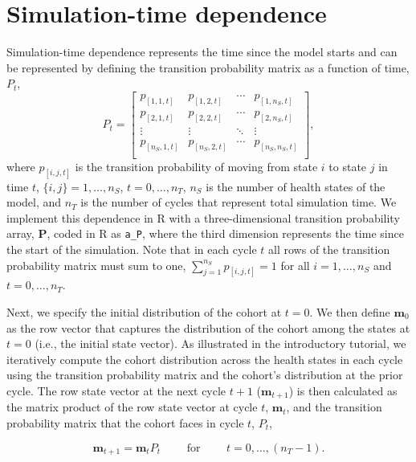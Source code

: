 \documentclass[
]{article}
\begin{document}
\hypertarget{simulation-time-dependence}{%
\section{Simulation-time dependence}\label{simulation-time-dependence}}

Simulation-time dependence represents the time since the model starts and can be represented by defining the transition probability matrix as a function of time, \(P_t\),
\[
  P_t = 
  \begin{bmatrix}
    p_{[1,1,t]} & p_{[1,2,t]} & \cdots & p_{[1,n_S,t]} \\
    p_{[2,1,t]} & p_{[2,2,t]} & \cdots & p_{[2,n_S,t]} \\
    \vdots    & \vdots  & \ddots & \vdots   \\
    p_{[n_S,1,t]} & p_{[n_S,2,t]} & \cdots & p_{[n_S,n_S,t]} \\
  \end{bmatrix},
\]
where \(p_{[i,j,t]}\) is the transition probability of moving from state \(i\) to state \(j\) in time \(t\), \(\{i,j\} = 1,\ldots, n_S\), \(t = 0,\ldots,n_T\), \(n_S\) is the number of health states of the model, and \(n_T\) is the number of cycles that represent total simulation time. We implement this dependence in R with a three-dimensional transition probability array, \(\mathbf{P}\), coded in R as \texttt{a\_P}, where the third dimension represents the time since the start of the simulation. Note that in each cycle \(t\) all rows of the transition probability matrix must sum to one, \(\sum_{j=1}^{n_S}{p_{[i,j,t]}} = 1\) for all \(i = 1,\ldots,n_S\) and \(t = 0,\ldots, n_T\).

Next, we specify the initial distribution of the cohort at \(t = 0\). We then define \(\mathbf{m}_{0}\) as the row vector that captures the distribution of the cohort among the states at \(t = 0\) (i.e., the initial state vector). As illustrated in the introductory tutorial, we iteratively compute the cohort distribution across the health states in each cycle using the transition probability matrix and the cohort's distribution at the prior cycle. The row state vector at the next cycle \(t+1\) (\(\mathbf{m}_{t+1}\)) is then calculated as the matrix product of the row state vector at cycle \(t\), \(\mathbf{m}_{t}\), and the transition probability matrix that the cohort faces in cycle \(t\), \(P_t\),

\begin{equation}
  \label{eq:time-dep-matrix-mult}
  \mathbf{m}_{t+1} = \mathbf{m}_{t} P_t \qquad\text{ for }\qquad t = 0,\ldots, (n_T - 1).
\end{equation}
\end{document}
